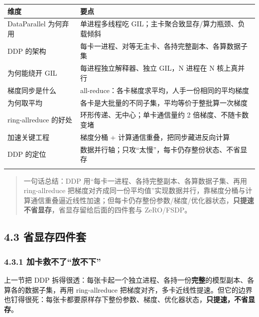 \documentclass[
  chinese,
]{ctexart}
\begin{document}
\begin{center}
\begin{tabular}{@{}>{\raggedright\arraybackslash}p{} >{\raggedright\arraybackslash}p{}@{}}
\toprule\noalign{}
维度 & 要点 \\
\midrule\noalign{}
DataParallel 为何弃用 & 单进程多线程吃 GIL；主卡聚合致显存/算力瓶颈、负载倾斜 \\
DDP 的架构 & 每卡一进程、对等无主卡、各持完整副本、各算数据子集 \\
为何能绕开 GIL & 每进程独立解释器、独立 GIL，N 进程在 N 核上真并行 \\
梯度同步是什么 & all-reduce：各卡梯度求平均，人手一份相同的平均梯度 \\
为何取平均 & 各卡是大批量的不同子集，平均等价于整批算一次梯度 \\
ring-allreduce 的好处 & 环形传递、无中心；单卡通信量约 2 倍梯度、不随卡数变堵 \\
加速关键工程 & 梯度分桶 + 计算通信重叠，把同步藏进反向计算 \\
DDP 的定位 & 数据并行轴；只攻``太慢''，每卡仍存整份状态、不省显存 \\
\bottomrule\noalign{}
\end{tabular}
\end{center}

\begin{quote}
一句话总结：DDP 用``每卡一进程、各持完整副本、各算数据子集、再用
ring-allreduce
把梯度对齐成同一份平均值''实现数据并行，靠梯度分桶与计算通信重叠逼近线性加速；但每卡仍存整份参数/梯度/优化器状态，\textbf{只提速不省显存}，省显存留给后面的四件套与
ZeRO/FSDP。
\end{quote}

\subsection{4.3
省显存四件套}\label{ux7701ux663eux5b58ux56dbux4ef6ux5957}

\subsubsection{4.3.1
加卡救不了``放不下''}\label{ux52a0ux5361ux6551ux4e0dux4e86ux653eux4e0dux4e0b}

上一节把 DDP
拆得很透：每张卡起一个独立进程、各持一份\textbf{完整}的模型副本、各算各的数据子集，再用
ring-allreduce
把梯度对齐，多卡近线性提速。但它的边界也钉得很死：每张卡都要原样存下整份参数、梯度、优化器状态，\textbf{只提速，不省显存}。
\end{document}

